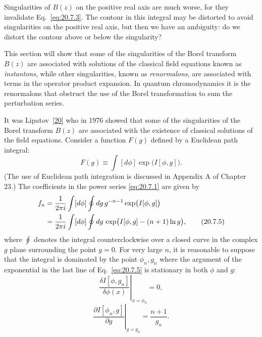 Singularities of $B(z)$ on the positive real axis are much worse, for they invalidate Eq.~\eqref{eq:20.7.3}. The contour in this integral may be distorted to avoid singularities on the positive real axis, but then we have an ambiguity: do we distort the contour above or below the singularity?

This section will show that some of the singularities of the Borel transform $B(z)$ are associated with solutions of the classical field equations known as \emph{instantons}, while other singularities, known as \emph{renormalons}, are associated with terms in the operator product expansion. In quantum chromodynamics it is the renormalons that obstruct the use of the Borel transformation to sum the perturbation series.

It was Lipatov~\hyperref[ch20-ref-20]{[20]} who in 1976 showed that some of the singularities of the Borel transform $B(z)$ are associated with the existence of classical solutions of the field equations. Consider a function $F(g)$ defined by a Euclidean path integral:
\begin{equation}
F(g)\equiv\int[d\phi]\exp\bigl(I[\phi,g]\bigr).
\tag{20.7.4}\label{eq:20.7.4}
\end{equation}
(The use of Euclidean path integration is discussed in Appendix A of Chapter 23.) The coefficients in the power series \eqref{eq:20.7.1} are given by
\begin{align}
f_n
&=\frac{1}{2\pi i}\int[d\phi]\oint dg\,g^{-n-1}
\exp\bigl(I[\phi,g]\bigr)
\notag\\
&=\frac{1}{2\pi i}\int[d\phi]\oint dg\,
\exp\bigl(I[\phi,g]-(n+1)\ln g\bigr),
\tag{20.7.5}\label{eq:20.7.5}
\end{align}
where $\oint$ denotes the integral counterclockwise over a closed curve in the complex $g$ plane surrounding the point $g=0$. For very large $n$, it is reasonable to suppose that the integral is dominated by the point $\phi_n,g_n$ where the argument of the exponential in the last line of Eq.~\eqref{eq:20.7.5} is stationary in both $\phi$ and $g$:
\begin{equation}
\left.
\frac{\delta I[\phi,g_n]}{\delta\phi(x)}
\right|_{\phi=\phi_n}
=0,
\tag{20.7.6}\label{eq:20.7.6}
\end{equation}
\begin{equation}
\left.
\frac{\partial I[\phi_n,g]}{\partial g}
\right|_{g=g_n}
=\frac{n+1}{g_n}.
\tag{20.7.7}\label{eq:20.7.7}
\end{equation}

